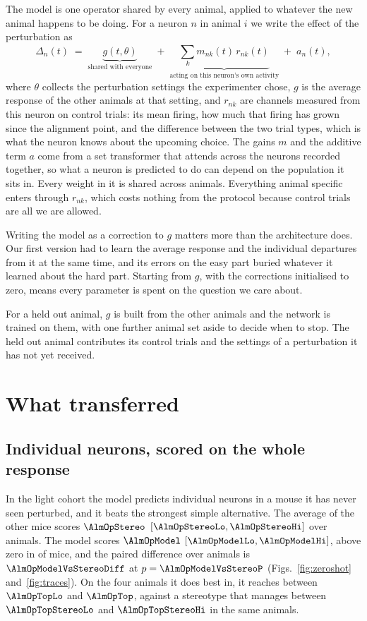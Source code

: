 \documentclass[11pt,letterpaper]{article}
\begin{document}
The model is one operator shared by every animal, applied to whatever the new animal
happens to be doing. For a neuron $n$ in animal $i$ we write the effect of the
perturbation as
\[
\widehat{\Delta}_n(t) \;=\; \underbrace{g(t,\theta)}_{\text{shared with everyone}}
\;+\; \underbrace{\textstyle\sum_k m_{nk}(t)\, r_{nk}(t)}_{\text{acting on this neuron's own activity}}
\;+\; a_n(t),
\]
where $\theta$ collects the perturbation settings the experimenter chose, $g$ is the
average response of the other animals at that setting, and $r_{nk}$ are channels
measured from this neuron on control trials: its mean firing, how much that firing has
grown since the alignment point, and the difference between the two trial types, which
is what the neuron knows about the upcoming choice. The gains $m$ and the additive
term $a$ come from a set transformer that attends across the neurons recorded together,
so what a neuron is predicted to do can depend on the population it sits in. Every
weight in it is shared across animals. Everything animal specific enters through
$r_{nk}$, which costs nothing from the protocol because control trials are all we are
allowed.

Writing the model as a correction to $g$ matters more than the architecture does. Our
first version had to learn the average response and the individual departures from it
at the same time, and its errors on the easy part buried whatever it learned about the
hard part. Starting from $g$, with the corrections initialised to zero, means every
parameter is spent on the question we care about.

For a held out animal, $g$ is built from the other animals and the network is trained
on them, with one further animal set aside to decide when to stop. The held out animal
contributes its control trials and the settings of a perturbation it has not yet
received.

\section{What transferred}

\subsection{Individual neurons, scored on the whole response}

In the light cohort the model predicts individual neurons in a mouse it has never seen
perturbed, and it beats the strongest simple alternative. The average of the other mice
scores $\AlmOpStereo$ $[\AlmOpStereoLo, \AlmOpStereoHi]$ over animals. The model scores
$\AlmOpModel$ $[\AlmOpModelLo, \AlmOpModelHi]$, above zero in \AlmOpModelPos{} of
\AlmOpModelN{} mice, and the paired difference over animals is
$\AlmOpModelVsStereoDiff$ at $p = \AlmOpModelVsStereoP$
(Figs.~\ref{fig:zeroshot} and~\ref{fig:traces}). On the four animals it does best in,
it reaches between $\AlmOpTopLo$ and $\AlmOpTop$, against a stereotype that manages
between $\AlmOpTopStereoLo$ and $\AlmOpTopStereoHi$ in the same animals.
\end{document}
